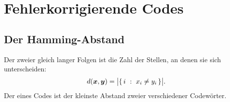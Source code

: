 \chapter{Fehlerkorrigierende Codes}

\section{Der Hamming-Abstand}

\begin{definition}
Der  zweier gleich langer Folgen ist die Zahl der Stellen, an denen sie sich unterscheiden:
\[ d(\boldsymbol{x},\boldsymbol{y}) = \bigl|\{\,i \ : \ x_i \ne y_i\,\}\bigr| . \]
Der  eines Codes ist der kleinste Abstand zweier verschiedener Codewörter.
\end{definition}

